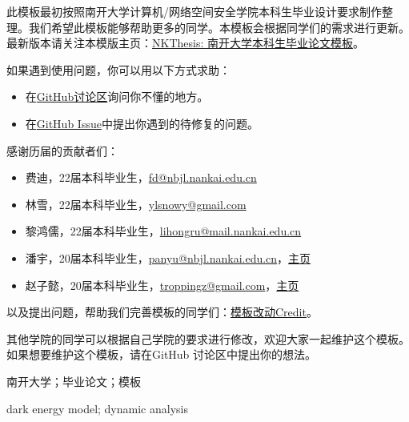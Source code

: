 

\begin{zhaiyao}
\begin{spacing}{1.5}
{

此模板最初按照南开大学计算机/网络空间安全学院本科生毕业设计要求制作整理。我们希望此模板能够帮助更多的同学。本模板会根据同学们的需求进行更新。最新版本请关注本模版主页：\href{https://tr0py.github.io/NKU-thesis-template-2020/}{NKThesis: 南开大学本科生毕业论文模板}。

如果遇到使用问题，你可以用以下方式求助：
\begin{itemize}
	\item 在\href{https://github.com/Tr0py/NKU-thesis-template-2020/discussions}{GitHub讨论区}询问你不懂的地方。
	\item 在\href{https://github.com/Tr0py/NKU-thesis-template-2020/issues}{GitHub Issue}中提出你遇到的待修复的问题。
\end{itemize}

	
感谢历届的贡献者们：
\begin{itemize}
    \item 费迪，22届本科毕业生，\url{fd@nbjl.nankai.edu.cn}
    \item 林雪，22届本科毕业生，\url{ylsnowy@gmail.com}
    \item 黎鸿儒，22届本科毕业生，\url{lihongru@mail.nankai.edu.cn}
    \item 潘宇，20届本科毕业生，\url{panyu@nbjl.nankai.edu.cn}，\href{https://nbjl.nankai.edu.cn/2019/0513/c19244a264683/page.htm}{主页}
    \item 赵子懿，20届本科毕业生，\url{troppingz@gmail.com}，\href{https://tr0py.github.io/}{主页}
\end{itemize}
}
以及提出问题，帮助我们完善模板的同学们：\href{https://github.com/Tr0py/NKU-thesis-template-2020/releases}{模板改动Credit}。

其他学院的同学可以根据自己学院的要求进行修改，欢迎大家一起维护这个模板。如果想要维护这个模板，请在GitHub 讨论区中提出你的想法。

\end{spacing}
\end{zhaiyao}




\begin{guanjianci}
南开大学；毕业论文；模板
\end{guanjianci}



\begin{abstract}
\begin{spacing}{1.5}
Since 1998, two independent supernova research groups have discovered that the universe is accelerating, and the dark energy has become a hot topic in cosmology. 

\end{spacing}
\end{abstract}


\begin{keywords}
dark energy model; dynamic analysis
\end{keywords} 
